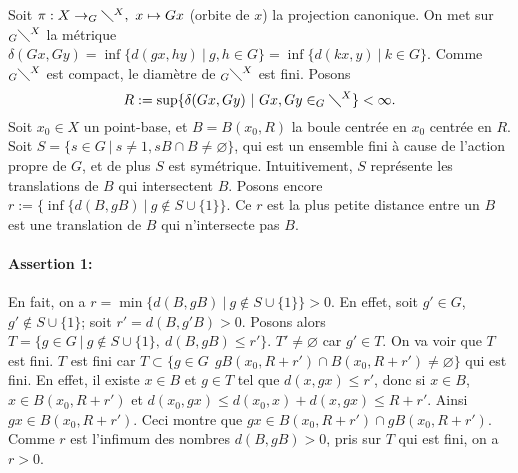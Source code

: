   \begin{preuve}
    Soit $\pi: X \to _G\diagdown^X,\ x \mapsto Gx$ (orbite de $x$) la projection canonique. On met sur
    $_G\diagdown^X$ la métrique $\delta(Gx, Gy) = \inf\{d(gx,hy)\ |\ g,h \in G\} = \inf\{ d(kx, y)\ |\ k \in
    G\}$. Comme $_G\diagdown^X$ est compact, le diamètre de $_G\diagdown^X$ est fini. Posons
      \[R := \sup\{\delta(Gx, Gy)\ |\ Gx, Gy \in _G\diagdown^X \} < \infty.\]
    Soit $x_0 \in X$ un point-base, et $B = B(x_0, R)$ la boule centrée en $x_0$ centrée en $R$. Soit $S = \{s
    \in G\ |\ s \neq 1, sB \cap B \neq \varnothing\}$, qui est un ensemble fini à cause de l'action propre de
    $G$, et de plus $S$ est symétrique. Intuitivement, $S$ représente les translations de $B$ qui intersectent
    $B$. Posons encore $r := \{ \inf\{ d(B, gB)\ |\ g \notin S \cup \{1\}\}$. Ce $r$ est la plus petite
    distance entre un $B$ est une translation de $B$  qui n'intersecte pas $B$.

    \paragraph{Assertion 1:} En fait, on a $r = \min\{ d(B, gB)\ |\ g \notin S \cup \{1\}\} > 0$. En effet,
    soit $g' \in G$, $g' \notin S \cup \{1\}$; soit $r' = d(B, g'B) > 0$. Posons alors $T = \{g \in G\ |\ g
    \notin S \cup \{1\},\ d(B, gB) \leq r'\}$. $T' \neq \varnothing$ car $g' \in T$. On va voir que $T$ est
    fini. $T$ est fini car $T \subset \{g \in G\ \ gB(x_0, R+r') \cap B(x_0, R+r') \neq \varnothing\}$ qui est
    fini. En effet, il existe $x \in B$ et $g \in T$ tel que $d(x, gx) \leq r'$, donc si $x \in B$, $x \in
    B(x_0, R+r')$ et $d(x_0, gx) \leq d(x_0, x) + d(x, gx) \leq R + r'$. Ainsi $gx \in B(x_0, R+r')$. Ceci
    montre que $gx \in B(x_0, R+r') \cap gB(x_0, R + r')$. Comme $r$ est l'infimum des nombres $d(B, gB) > 0$,
    pris sur $T$ qui est fini, on a $r > 0$.

    \begin{center}
    \end{center}


\end{preuve}
